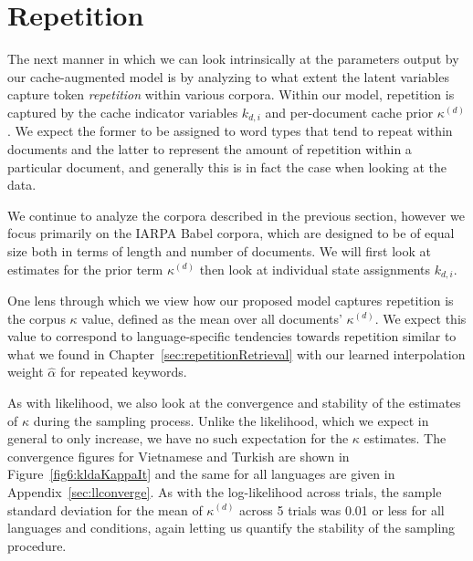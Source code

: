 \section{Repetition}
\label{sec:kldaRepetition}

The next manner in which we can look intrinsically at the parameters output by our cache-augmented model is by analyzing to what extent the latent variables capture token \textit{repetition} within various corpora.  Within our model, repetition is captured by the cache indicator variables $k_{d,i}$ and per-document cache prior $\kappa^{(d)}$.  We expect the former to be assigned to word types that tend to repeat within documents and the latter to represent the amount of repetition within a particular document, and generally this is in fact the case when looking at the data.

We continue to analyze the corpora described in the previous section, however we focus primarily on the IARPA Babel corpora, which are designed to be of equal size both in terms of length and number of documents.  We will first look at estimates for the prior term $\kappa^{(d)}$ then look at individual state assignments $k_{d,i}$.  

One lens through which we view how our proposed model captures repetition is the corpus $\kappa$ value, defined as the mean over all documents' $\kappa^{(d)}$.  We expect this value to correspond to language-specific tendencies towards repetition similar to what we found in Chapter~\ref{sec:repetitionRetrieval} with our learned interpolation weight $\widehat{\alpha}$ for repeated keywords. 

As with likelihood, we also look at the convergence and stability of the estimates of $\kappa$ during the sampling process.  Unlike the likelihood, which we expect in general to only increase, we have no such expectation for the $\kappa$ estimates.  The convergence figures for Vietnamese and Turkish are shown in Figure~\ref{fig6:kldaKappaIt} and the same for all languages are given in Appendix~\ref{sec:llconverge}.   As with the log-likelihood across trials, the sample standard deviation for the mean of $\kappa^{(d)}$ across 5 trials was 0.01 or less for all languages and conditions, again letting us quantify the stability of the sampling procedure.

